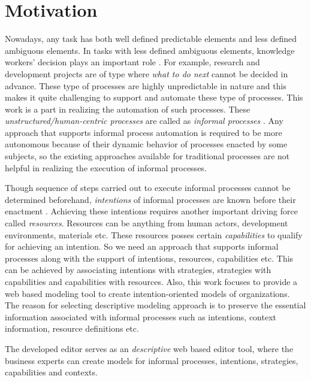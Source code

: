 \section{Motivation}
\label{sec:motivation}
Nowadays, any task has both well defined predictable elements and less defined ambiguous elements. In tasks with less defined ambiguous elements, knowledge workers' decision plays an important role \cite{BPTrends2009}. For example, research and development projects are of type where \textit{what to do next} cannot be decided in advance. These type of processes are highly unpredictable in nature and this makes it quite challenging to support and automate these type of processes. This work is a part in realizing the automation of such processes. These \textit{unstructured/human-centric processes} are called as \textit{informal processes} \cite{Sungur2014}. Any approach that supports informal process automation is required to be more autonomous because of their dynamic behavior of processes enacted by some subjects, so the existing approaches available for traditional processes are not helpful in realizing the execution of informal processes.  

Though sequence of steps carried out to execute informal processes cannot be determined beforehand, \textit{intentions} of informal processes are known before their enactment \cite{Sungur2015}. Achieving these intentions requires another important driving force called \textit{resources}. Resources can be anything from human actors, development environments, materials etc. These resources posses certain \textit{capabilities} to qualify for achieving an intention. So we need an approach that supports informal processes along with the support of intentions, resources, capabilities etc. This can be achieved by associating intentions with strategies, strategies with capabilities and capabilities with resources. Also, this work focuses to provide a web based modeling tool to create intention-oriented models of organizations. The reason for selecting descriptive modeling approach is to preserve the essential information associated with informal processes such as intentions, context information, resource definitions etc.   

The developed editor serves as an \textit{descriptive} web based editor tool, where the business experts can create models for informal processes, intentions, strategies, capabilities and contexts.  

